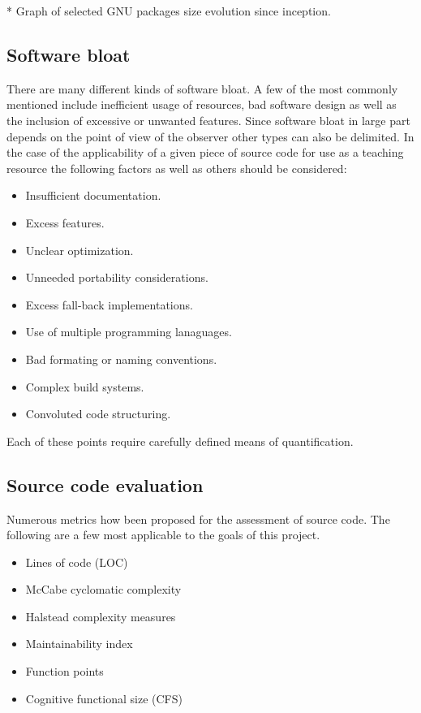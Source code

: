 * Graph of selected GNU packages size evolution since inception.

\subsection{Software bloat}

There are many different kinds of software bloat. A few of the most commonly mentioned include inefficient usage of resources, bad software design as well as the inclusion of excessive or unwanted features. Since software bloat in large part depends on the point of view of the observer other types can also be delimited. In the case of the applicability of a given piece of source code for use as a teaching resource the following factors as well as others should be considered:

\begin{itemize}
    \item Insufficient documentation.
    \item Excess features.
    \item Unclear optimization.
    \item Unneeded portability considerations.
    \item Excess fall-back implementations.
    \item Use of multiple programming lanaguages.
    \item Bad formating or naming conventions.
    \item Complex build systems.
    \item Convoluted code structuring.
\end{itemize}

Each of these points require carefully defined means of quantification.

\subsection{Source code evaluation}

Numerous metrics how been proposed for the assessment of source code.
The following are a few most applicable to the goals of this project.

\begin{itemize}
    \item Lines of code (LOC)
    \item McCabe cyclomatic complexity
    \item Halstead complexity measures
    \item Maintainability index
    \item Function points
    \item Cognitive functional size (CFS)
\end{itemize}

